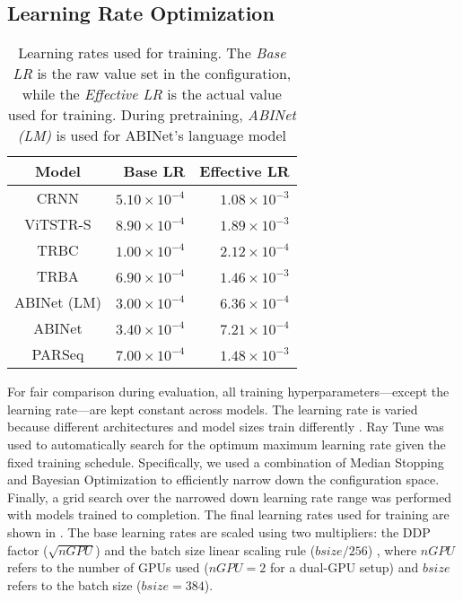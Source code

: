 \subsection{Learning Rate Optimization}
\label{ch:learning-rates}

\begin{table}[htbp]
  \centering
  \fontsize{7}{8.4}\selectfont
  \setlength{\tabcolsep}{5pt}
  \caption[Learning rates used for training.]{Learning rates used for training. The \textit{Base LR} is the raw value set in the configuration, while the \textit{Effective LR} is the actual value used for training. During pretraining, \textit{ABINet (LM)} is used for ABINet's language model}
  \begin{tabular}{ c | r r }
    \toprule
    Model & Base LR & Effective LR \\
    \midrule
    CRNN & $5.10\times10^{-4}$ & $1.08\times10^{-3}$ \\
    ViTSTR-S & $8.90\times10^{-4}$ & $1.89\times10^{-3}$ \\
    TRBC & $1.00\times10^{-4}$ & $2.12\times10^{-4}$ \\
    TRBA & $6.90\times10^{-4}$ & $1.46\times10^{-3}$ \\
    ABINet (LM) & $3.00\times10^{-4}$ & $6.36\times10^{-4}$ \\
    ABINet & $3.40\times10^{-4}$ & $7.21\times10^{-4}$ \\
    PARSeq & $7.00\times10^{-4}$ & $1.48\times10^{-3}$ \\
    \bottomrule
  \end{tabular}
  \label{tab:learning-rates}
\end{table}

For fair comparison during evaluation, all training hyperparameters---except the learning rate---are kept constant across models. The learning rate is varied because different architectures and model sizes train differently \cite{li2020train}. Ray Tune \cite{liaw2018tune} was used to automatically search for the optimum maximum learning rate given the fixed training schedule. Specifically, we used a combination of Median Stopping \cite{Vizier} and Bayesian Optimization \cite{balandat2020botorch} to efficiently narrow down the configuration space. Finally, a grid search over the narrowed down learning rate range was performed with models trained to completion. The final learning rates used for training are shown in . The base learning rates are scaled using two multipliers: the DDP factor ($\sqrt{nGPU}$) and the batch size linear scaling rule ($bsize / 256$) \cite{goyal2017accurate}, where $nGPU$ refers to the number of GPUs used (\ie $nGPU = 2$ for a dual-GPU setup) and $bsize$ refers to the batch size (\ie $bsize = 384$).

